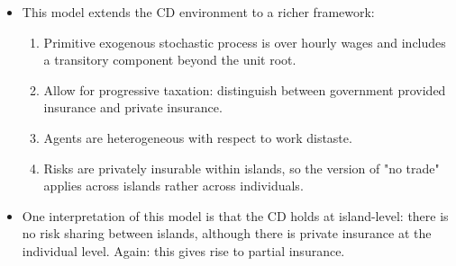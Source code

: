 \documentclass[notes=show]{beamer}
\begin{document}
\begin{frame}%


\begin{itemize}
\item This model extends the CD environment to a richer framework:

\begin{enumerate}
\item Primitive exogenous stochastic process is over hourly wages and
includes a transitory component beyond the unit root.

\item Allow for progressive taxation: distinguish between government
provided insurance and private insurance.

\item Agents are heterogeneous with respect to work distaste.

\item Risks are privately insurable within islands, so the version of "no
trade" applies across islands rather across individuals.
\end{enumerate}

\item One interpretation of this model is that the CD holds at island-level:
there is no risk sharing between islands, although there is private
insurance at the individual level. Again: this gives rise to partial
insurance.
\end{itemize}

\transboxout%
\end{frame}%

\bigskip
\end{document}
